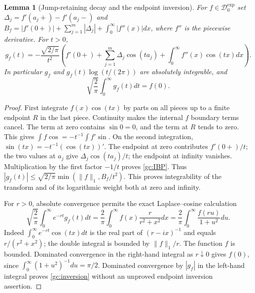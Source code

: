 \documentclass[11pt]{article}
\newtheorem{lemma}[theorem]{Lemma}
\begin{document}
\begin{lemma}[Jump-retaining decay and the endpoint inversion]
For $f\in\mathcal D_0^{\exp}$ set
$\Delta_j=f'(a_j+)-f'(a_j-)$ and
$B_f=|f'(0+)|+\sum_{j=1}^m|\Delta_j|+\int_0^\infty|f''(x)|dx$,
where $f''$ is the piecewise derivative.  For $t>0$,
\begin{equation}
 g_f(t)=-\frac{\sqrt{2/\pi}}{t^2}
 \left(f'(0+)+\sum_{j=1}^m\Delta_j\cos(ta_j)
                   +\int_0^\infty f''(x)\cos(tx)dx\right).
 \label{gc:IBP}
\end{equation}
In particular $g_f$ and $g_f(t)\log(t/(2\pi))$ are absolutely integrable,
and
\begin{equation}
 \sqrt{\frac2\pi}\int_0^\infty g_f(t)dt=f(0).
 \label{gc:inversion}
\end{equation}
\end{lemma}
\begin{proof}
First integrate $f(x)\cos(tx)$ by parts on all pieces up to a finite
endpoint $R$ in the last piece.  Continuity makes the internal $f$
boundary terms cancel.  The term at zero contains $\sin0=0$, and the
term at $R$ tends to zero.  This gives
$\int f\cos=-t^{-1}\int f'\sin$.
On the second integration, $\sin(tx)=-t^{-1}(\cos(tx))'$.
The endpoint at zero contributes $f'(0+)/t$; the two values at $a_j$
give $\Delta_j\cos(ta_j)/t$; the endpoint at infinity vanishes.
Multiplication by the first factor $-1/t$ proves \eqref{gc:IBP}.
Thus
$|g_f(t)|\le\sqrt{2/\pi}\min(\|f\|_1,B_f/t^2)$.
This proves integrability of the transform and of its logarithmic weight
both at zero and infinity.

For $r>0$, absolute convergence permits the exact Laplace--cosine
calculation
\begin{equation}
 \sqrt{\frac2\pi}\int_0^\infty e^{-rt}g_f(t)dt
  =\frac2\pi\int_0^\infty f(x)\frac{r}{r^2+x^2}dx
  =\frac2\pi\int_0^\infty\frac{f(ru)}{1+u^2}du.
 \label{gc:Poisson}
\end{equation}
Indeed $\int_0^\infty e^{-rt}\cos(tx)dt$
is the real part of $(r-ix)^{-1}$ and equals $r/(r^2+x^2)$;
the double integral is bounded by $\|f\|_1/r$.
The function $f$ is bounded.  Dominated convergence in the right-hand
integral as $r\downarrow0$ gives $f(0)$, since
$\int_0^\infty(1+u^2)^{-1}du=\pi/2$.
Dominated convergence by $|g_f|$ in the left-hand integral proves
\eqref{gc:inversion} without an unproved endpoint inversion assertion.
\end{proof}
\end{document}
